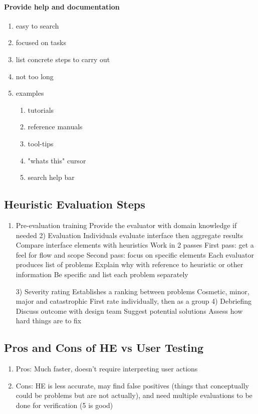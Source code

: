 \paragraph{Provide help and documentation}
\begin{enumerate}
    \item easy to search
    \item focused on tasks
    \item list concrete steps to carry out
    \item not too long
    \item examples \begin{enumerate}
        \item tutorials
        \item reference manuals
        \item tool-tips
        \item "whats this" cursor
        \item search help bar
    \end{enumerate}
\end{enumerate}

\subsection{Heuristic Evaluation Steps}
\begin{enumerate}
    \item Pre-evaluation training
Provide the evaluator with domain knowledge if needed
2) Evaluation
Individuals evaluate interface then aggregate results
Compare interface elements with heuristics
Work in 2 passes
First pass: get a feel for flow and scope
Second pass: focus on specific elements
Each evaluator produces list of problems
Explain why with reference to heuristic or other information
Be specific and list each problem separately

3) Severity rating
Establishes a ranking between problems
Cosmetic, minor, major and catastrophic
First rate individually, then as a group
4) Debriefing
Discuss outcome with design team
Suggest potential solutions
Assess how hard things are to fix
\end{enumerate}

\subsection{Pros and Cons of HE vs User Testing}
\begin{enumerate}
    \item Pros: Much faster, doesn't require interpreting user actions
    \item Cons: HE is less accurate, may find false positives (things that conceptually could be problems but are not actually), and need multiple evaluations to be done for verification (5 is good)
\end{enumerate}
